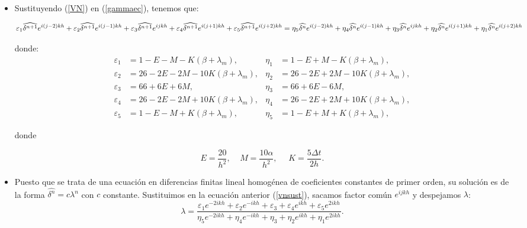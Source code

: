 \begin{itemize}
    \item Sustituyendo (\ref{VN}) en (\ref{gammaec}), tenemos que:
    
    \begin{equation}\label{vnsust}
        \varepsilon_{1}\widehat{\delta^{n+1}}e^{i(j-2)kh}+\varepsilon_{2}\widehat{\delta^{n+1}}e^{i(j-1)kh}+\varepsilon_{3}\widehat{\delta^{n+1}}e^{ijkh}+\varepsilon_{4}\widehat{\delta^{n+1}}e^{i(j+1)kh}+\varepsilon_{5}\widehat{\delta^{n+1}}e^{i(j+2)kh}=\\
        
        \eta_{5}\widehat{\delta^{n}}e^{i(j-2)kh}+\eta_{4}\widehat{\delta^{n}}e^{i(j-1)kh}+\eta_{3}\widehat{\delta^{n}}e^{ijkh}+\eta_{2}\widehat{\delta^{n}}e^{i(j+1)kh}+\eta_{1}\widehat{\delta^{n}}e^{i(j+2)kh}
   \end{equation} 
  
\noindent donde:
\begin{align*}
    \varepsilon_{1}& =1-E-M-K(\beta+\lambda_{m}), & \eta_{1}& =1-E+M-K(\beta+\lambda_{m}),\\
    \varepsilon_{2}&=26-2E-2M-10K(\beta+\lambda_{m}), & \eta_{2} &=26-2E+2M-10K(\beta+\lambda_{m}),\\
    \varepsilon_{3} &=66+6E+6M , & \eta_{3} &=66+6E-6M,\\
    \varepsilon_{4} & =26-2E-2M+10K(\beta+\lambda_{m}), & \eta_{4}& =26-2E+2M+10K(\beta+\lambda_{m}),\\
    \varepsilon_{5} &=1-E-M+K(\beta+\lambda_{m}), & \eta_{5} &=1-E+M+K(\beta+\lambda_{m}),
\end{align*}

\noindent donde

$$E=\frac{20}{h^{2}}, \ \ \ \ \ M=\frac{10\alpha}{h^{2}}, \ \ \ \ \ \ K=\frac{5\Delta t}{2h}.$$

    \item Puesto que se trata de una ecuación en diferencias finitas lineal homogénea de coeficientes constantes de primer orden, su solución es de la forma $\widehat{\delta^{n}}=c\lambda^{n}$ con $c$ constante. Sustituimos en la ecuación anterior (\ref{vnsust}), sacamos factor común $e^{ijkh}$ y despejamos $\lambda$:
    \begin{equation}
    \label{lambdadespejado}
        \lambda=\frac{\varepsilon_{1}e^{-2ikh}+\varepsilon_{2}e^{-ikh}+\varepsilon_{3}+\varepsilon_{4}e^{ikh}+\varepsilon_{5}e^{2ikh}}{\eta_{5}e^{-2ikh}+\eta_{4}e^{-ikh}+\eta_{3}+\eta_{2}e^{ikh}+\eta_{1}e^{2ikh}}.
    \end{equation}
    

\end{itemize}
